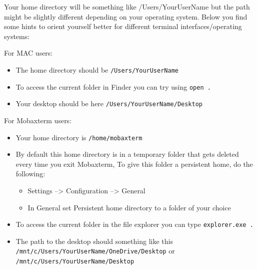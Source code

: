 \documentclass[
  letterpaper,
  DIV=11,
  numbers=noendperiod]{scrreprt}
\providecommand{\tightlist}{%
  \setlength{\itemsep}{0pt}\setlength{\parskip}{0pt}}\usepackage{longtable,booktabs,array}
\begin{document}
\begin{tcolorbox}[enhanced jigsaw, breakable, left=2mm, title=\textcolor{quarto-callout-tip-color}{\faLightbulb}\hspace{0.5em}{Tip: finding the desktop on different user systems}, opacityback=0, opacitybacktitle=0.6, rightrule=.15mm, bottomrule=.15mm, colback=white, colframe=quarto-callout-tip-color-frame, coltitle=black, bottomtitle=1mm, arc=.35mm, toprule=.15mm, colbacktitle=quarto-callout-tip-color!10!white, toptitle=1mm, titlerule=0mm, leftrule=.75mm]

Your home directory will be something like /Users/YourUserName but the
path might be slightly different depending on your operating system.
Below you find some hints to orient yourself better for different
terminal interfaces/operating systems:

For MAC users:

\begin{itemize}
\tightlist
\item
  The home directory should be \texttt{/Users/YourUserName}
\item
  To access the current folder in Finder you can try using
  \texttt{open\ .}
\item
  Your desktop should be here \texttt{/Users/YourUserName/Desktop}
\end{itemize}

For Mobaxterm users:

\begin{itemize}
\tightlist
\item
  Your home directory is \texttt{/home/mobaxterm}
\item
  By default this home directory is in a temporary folder that gets
  deleted every time you exit Mobaxterm, To give this folder a
  persistent home, do the following:

  \begin{itemize}
  \tightlist
  \item
    Settings --\textgreater{} Configuration --\textgreater{} General
  \item
    In General set Persistent home directory to a folder of your choice
  \end{itemize}
\item
  To access the current folder in the file explorer you can type
  \texttt{explorer.exe\ .}
\item
  The path to the desktop should something like this
  \texttt{/mnt/c/Users/YourUserName/OneDrive/Desktop} or
  \texttt{/mnt/c/Users/YourUserName/Desktop}
\end{itemize}


\end{tcolorbox}
\end{document}
